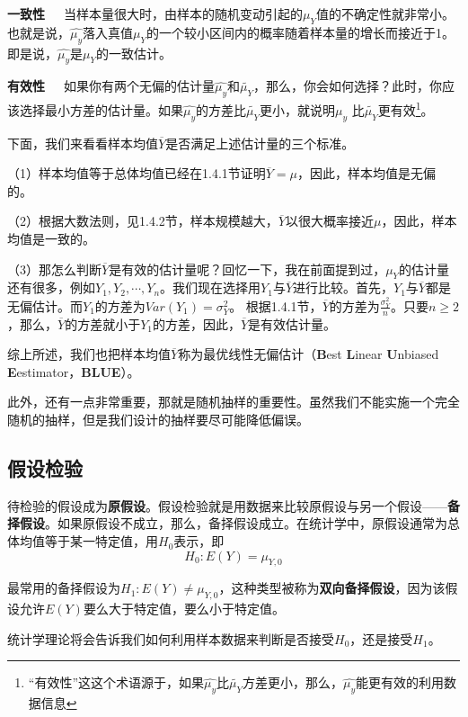 \documentclass[cn,10pt,math=newtx,citestyle=gb7714-2015,bibstyle=gb7714-2015]{elegantbook}
\begin{document}
	\textbf{一致性}~~~当样本量很大时，由样本的随机变动引起的$\mu_Y$值的不确定性就非常小。也就是说，$\hat{\mu_y}$落入真值$\mu_Y$的一个较小区间内的概率随着样本量的增长而接近于1。即是说，$\hat{\mu_y}$是$\mu_Y$的一致估计。
	
	\textbf{有效性}~~~如果你有两个无偏的估计量$\hat{\mu_y}$和$\tilde{\mu_Y}$，那么，你会如何选择？此时，你应该选择最小方差的估计量。如果$\hat{\mu_y}$的方差比$\tilde{\mu_Y}$更小，就说明$\hat{\mu_y}$ 比$\tilde{\mu_Y}$更有效\footnote{“有效性”这这个术语源于，如果$\hat{\mu_y}$比$\tilde{\mu_Y}$方差更小，那么，$\hat{\mu_y}$能更有效的利用数据信息}。
	
	下面，我们来看看样本均值$\overline{Y}$是否满足上述估计量的三个标准。
	
	（1）样本均值等于总体均值已经在1.4.1节证明$\overline{Y}=\mu$，因此，样本均值是无偏的。
	
	（2）根据大数法则，见1.4.2节，样本规模越大，$\overline{Y}$以很大概率接近$\mu$，因此，样本均值是一致的。
	
	（3）那怎么判断$\overline{Y}$是有效的估计量呢？回忆一下，我在前面提到过，$\mu_Y$的估计量还有很多，例如$Y_1,Y_2,\cdots,Y_n$。我们现在选择用$Y_1$与$\overline{Y}$进行比较。首先，$Y_1$与$\overline{Y}$都是无偏估计。而$Y_1$的方差为$Var(Y_1)=\sigma_Y^2$。 根据1.4.1节，$\overline{Y}$的方差为$\frac{\sigma_Y^2}{n}$。只要$n\ge2$，那么，$\overline{Y}$的方差就小于$Y_1$的方差，因此，$\overline{Y}$是有效估计量。
	
	综上所述，我们也把样本均值$\overline{Y}$称为最优线性无偏估计（\textbf{B}est \textbf{L}inear \textbf{U}nbiased \textbf{E}estimator，\textbf{BLUE}）。
	
	此外，还有一点非常重要，那就是随机抽样的重要性。虽然我们不能实施一个完全随机的抽样，但是我们设计的抽样要尽可能降低偏误。
	
	\subsection{假设检验}
	待检验的假设成为\textbf{原假设}。假设检验就是用数据来比较原假设与另一个假设——\textbf{备择假设}。如果原假设不成立，那么，备择假设成立。在统计学中，原假设通常为总体均值等于某一特定值，用$H_0$表示，即
	\begin{equation}
		H_0:E(Y)=\mu_{Y,0}
	\end{equation}
	
	最常用的备择假设为$H_1:E(Y)\neq\mu_{Y,0}$，这种类型被称为\textbf{双向备择假设}，因为该假设允许$E(Y)$要么大于特定值，要么小于特定值。
	
	统计学理论将会告诉我们如何利用样本数据来判断是否接受$H_0$，还是接受$H_1$。
	
\end{document}
